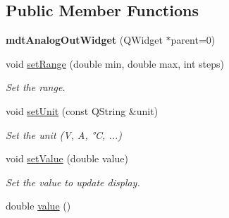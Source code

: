 \subsection*{Public Member Functions}
\begin{DoxyCompactItemize}
\item 
\hypertarget{classmdt_analog_out_widget_a67b74fd871997e281321de20f3def45c}{
{\bfseries mdtAnalogOutWidget} (QWidget $\ast$parent=0)}
\label{classmdt_analog_out_widget_a67b74fd871997e281321de20f3def45c}

\item 
void \hyperlink{classmdt_analog_out_widget_a0c50c8fc341f37bb57dfcb98092a64d9}{setRange} (double min, double max, int steps)
\begin{DoxyCompactList}\small\item\em Set the range. \end{DoxyCompactList}\item 
\hypertarget{classmdt_analog_out_widget_a76d703aa049b5c1d1a5c4f3100d7240f}{
void \hyperlink{classmdt_analog_out_widget_a76d703aa049b5c1d1a5c4f3100d7240f}{setUnit} (const QString \&unit)}
\label{classmdt_analog_out_widget_a76d703aa049b5c1d1a5c4f3100d7240f}

\begin{DoxyCompactList}\small\item\em Set the unit (V, A, °C, ...) \end{DoxyCompactList}\item 
\hypertarget{classmdt_analog_out_widget_a43348237ff45247022d08fb244f0eae1}{
void \hyperlink{classmdt_analog_out_widget_a43348237ff45247022d08fb244f0eae1}{setValue} (double value)}
\label{classmdt_analog_out_widget_a43348237ff45247022d08fb244f0eae1}

\begin{DoxyCompactList}\small\item\em Set the value to update display. \end{DoxyCompactList}\item 
\hypertarget{classmdt_analog_out_widget_a5e02254a08c9db3991b0b67d6fdef03c}{
double \hyperlink{classmdt_analog_out_widget_a5e02254a08c9db3991b0b67d6fdef03c}{value} ()}
\label{classmdt_analog_out_widget_a5e02254a08c9db3991b0b67d6fdef03c}


\end{DoxyCompactItemize}
